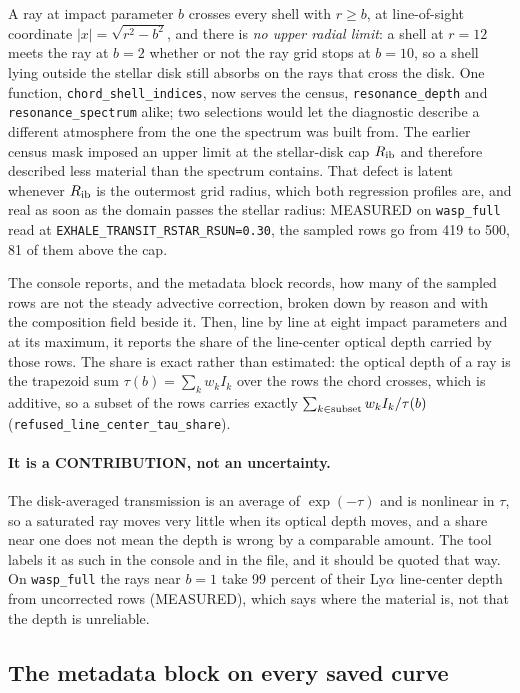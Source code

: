 \documentclass[english,a4paper]{my_memo}
\begin{document}
A ray at impact parameter $b$ crosses every shell with $r \ge b$, at
line-of-sight coordinate $|x| = \sqrt{r^2-b^2}$, and there is \emph{no upper
radial limit}: a shell at $r = 12$ meets the ray at $b = 2$ whether or not
the ray grid stops at $b = 10$, so a shell lying outside the stellar disk
still absorbs on the rays that cross the disk. One function,
\verb|chord_shell_indices|, now serves the census, \verb|resonance_depth|
and \verb|resonance_spectrum| alike; two selections would let the diagnostic
describe a different atmosphere from the one the spectrum was built from.
The earlier census mask imposed an upper limit at the stellar-disk cap
$R_{\rm ib}$ and therefore described less material than the spectrum
contains. That defect is latent whenever $R_{\rm ib}$ is the outermost grid
radius, which both regression profiles are, and real as soon as the domain
passes the stellar radius: MEASURED on \verb|wasp_full| read at
\verb|EXHALE_TRANSIT_RSTAR_RSUN=0.30|, the sampled rows go from 419 to 500,
81 of them above the cap.

The console reports, and the metadata block records, how many of the sampled
rows are not the steady advective correction, broken down by reason and with
the composition field beside it. Then, line by line at eight impact
parameters and at its maximum, it reports the share of the line-center
optical depth carried by those rows. The share is exact rather than
estimated: the optical depth of a ray is the trapezoid sum
$\tau(b) = \sum_k w_k I_k$ over the rows the chord crosses, which is
additive, so a subset of the rows carries exactly
$\sum_{k \in \rm subset} w_k I_k / \tau(b)$
(\verb|refused_line_center_tau_share|).

\paragraph{It is a CONTRIBUTION, not an uncertainty.} The disk-averaged
transmission is an average of $\exp(-\tau)$ and is nonlinear in $\tau$, so a
saturated ray moves very little when its optical depth moves, and a share
near one does not mean the depth is wrong by a comparable amount. The tool
labels it as such in the console and in the file, and it should be quoted
that way. On \verb|wasp_full| the rays near $b = 1$ take 99 percent of their
Ly$\alpha$ line-center depth from uncorrected rows (MEASURED), which says
where the material is, not that the depth is unreliable.

\subsection{The metadata block on every saved curve}
\label{sec:metadata}
\end{document}
